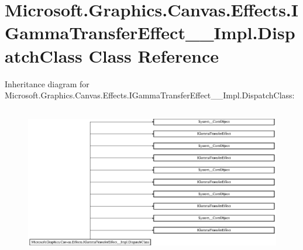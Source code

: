 \hypertarget{class_microsoft_1_1_graphics_1_1_canvas_1_1_effects_1_1_i_gamma_transfer_effect_____impl_1_1_dispatch_class}{}\section{Microsoft.\+Graphics.\+Canvas.\+Effects.\+I\+Gamma\+Transfer\+Effect\+\_\+\+\_\+\+Impl.\+Dispatch\+Class Class Reference}
\label{class_microsoft_1_1_graphics_1_1_canvas_1_1_effects_1_1_i_gamma_transfer_effect_____impl_1_1_dispatch_class}
Inheritance diagram for Microsoft.\+Graphics.\+Canvas.\+Effects.\+I\+Gamma\+Transfer\+Effect\+\_\+\+\_\+\+Impl.\+Dispatch\+Class\+:\begin{figure}[H]
\begin{center}
\leavevmode
\includegraphics[height=6.595289cm]{class_microsoft_1_1_graphics_1_1_canvas_1_1_effects_1_1_i_gamma_transfer_effect_____impl_1_1_dispatch_class}
\end{center}
\end{figure}
